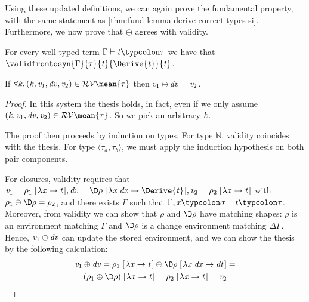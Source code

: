 Using these updated definitions, we can again prove the
fundamental property, with the same statement as
\cref{thm:fund-lemma-derive-correct-types-si}. Furthermore, we now
prove that \ensuremath{\oplus } agrees with validity.
\begin{theorem}
  \label{thm:fund-lemma-derive-correct-types-si-intensional}
  For every well-typed term \ensuremath{\Gamma\vdash\Varid{t}\typcolon\tau} we have that
  \ensuremath{\validfromtosyn{\Gamma}{\tau}{\Varid{t}}{\Derive{\Varid{t}}}{\Varid{t}}}.
\end{theorem}
\begin{theorem}
  \label{thm:oplus-validity-intensional}
If \ensuremath{\forall \Varid{k}\hsforall \hsdot{\circ }{\mathpunct{.}}(\Varid{k},\Varid{v}_{1},\Varid{dv},\Varid{v}_{2})\in \mathcal{RV}\mean{\tau}} then \ensuremath{\Varid{v}_{1}\oplus \Varid{dv}\mathrel{=}\Varid{v}_{2}}.
\end{theorem}
\begin{proof}
  In this system the thesis holds, in fact, even if we only assume \ensuremath{(\Varid{k},\Varid{v}_{1},\Varid{dv},\Varid{v}_{2})\in \mathcal{RV}\mean{\tau}}. So we pick an arbitrary \ensuremath{\Varid{k}}.

  The proof then proceeds by induction on types. For type \ensuremath{\mathbb{N}}, validity coincides with the
  thesis. For type \ensuremath{\langle\tau_a,\tau_b\rangle}, we must apply the
  induction hypothesis on both pair components.

  For closures, validity requires that \ensuremath{\Varid{v}_{1}\mathrel{=}\rho_{1}\;[\mskip1.5mu \lambda \Varid{x}\to \Varid{t}\mskip1.5mu],\Varid{dv}\mathrel{=}\D\rho\;[\mskip1.5mu \lambda \Varid{x}\;\Varid{dx}\to \Derive{\Varid{t}}\mskip1.5mu],\Varid{v}_{2}\mathrel{=}\rho_{2}\;[\mskip1.5mu \lambda \Varid{x}\to \Varid{t}\mskip1.5mu]} with \ensuremath{\rho_{1}\oplus \D\rho\mathrel{=}\rho_{2}}, and there exists \ensuremath{\Gamma} such that \ensuremath{\Gamma,\Varid{x}\typcolon\sigma\vdash\Varid{t}\typcolon\tau}. Moreover, from validity we can show that \ensuremath{\rho}
  and \ensuremath{\D\rho} have matching shapes: \ensuremath{\rho} is an environment
  matching \ensuremath{\Gamma} and \ensuremath{\D\rho} is a change environment matching
  \ensuremath{\Delta \Gamma}. Hence, \ensuremath{\Varid{v}_{1}\oplus \Varid{dv}} can update the stored
  environment, and we can show the thesis by the following
  calculation:
  \begin{multline*}
    \ensuremath{\Varid{v}_{1}\oplus \Varid{dv}\mathrel{=}\rho_{1}\;[\mskip1.5mu \lambda \Varid{x}\to \Varid{t}\mskip1.5mu]\oplus \D\rho\;[\mskip1.5mu \lambda \Varid{x}\;\Varid{dx}\to \Varid{dt}\mskip1.5mu]\mathrel{=}}\\
    \ensuremath{(\rho_{1}\oplus \D\rho)\;[\mskip1.5mu \lambda \Varid{x}\to \Varid{t}\mskip1.5mu]\mathrel{=}\rho_{2}\;[\mskip1.5mu \lambda \Varid{x}\to \Varid{t}\mskip1.5mu]\mathrel{=}\Varid{v}_{2}}
  \end{multline*}
\end{proof}

